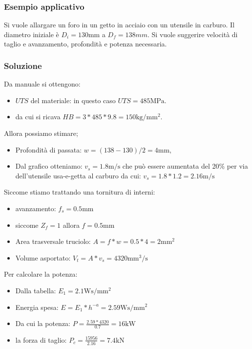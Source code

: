 \subsubsection{Esempio applicativo}
Si vuole allargare un foro in un getto in acciaio con un utensile in carburo. Il diametro iniziale è $D_i = 130\unit{\mm}$ a $D_f = 138\unit{mm}$. Si vuole suggerire velocità di taglio e avanzamento, profondità e potenza necessaria.

\subsubsection*{Soluzione}
Da manuale si ottengono: 
\begin{itemize}
\item $UTS$ del materiale: in questo caso $UTS = 485\unit{\MPa}$.
\item da cui si ricava $HB = 3*485*9.8=150\unit{\kg/\mm^2}$.
\end{itemize}
Allora possiamo stimare;
\begin{itemize}
\item Profondità di passata: $w = (138-130)/2 = 4\unit{\mm}$,
\item Dal grafico otteniamo: $v_s = 1.8\unit{\m/\s}$ che può essere aumentata del 20\% per via dell'utensile usa-e-getta al carburo da cui: $v_s = 1.8 * 1.2 = 2.16\unit{\m/\s}$
\end{itemize}
Siccome stiamo trattando una tornitura di interni:
\begin{itemize}
\item avanzamento: $f_s = 0.5\unit{\mm}$
\item siccome $Z_f = 1$ allora $f = 0.5\unit{\mm}$
\item Area trasversale truciolo: $A = f*w = 0.5*4 = 2\unit{\mm^2}$
\item Volume asportato: $V_t = A * v_s = 4320\unit{\mm^3/\s}$
\end{itemize}
Per calcolare la potenza:
\begin{itemize}
\item Dalla tabella: $E_1 = 2.1\unit{\W\s/\mm^2}$
\item Energia spesa: $E = E_1 * h^{-a}= 2.59\unit{\W\s/\mm^2}$
\item Da cui la potenza: $P = \frac{2.59 * 4320}{0.7} = 16\unit{\kW}$
\item la forza di taglio: $P_c = \frac{15956}{2.16} = 7.4\unit{\kN}$
\end{itemize}

